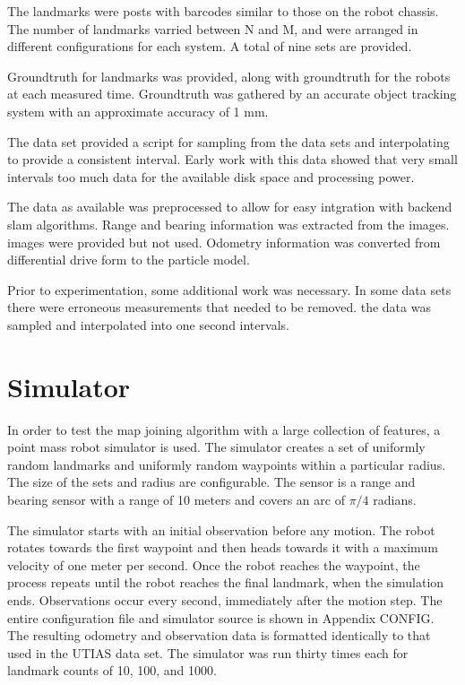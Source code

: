 \documentclass[12pt]{report}
\begin{document}
The landmarks were posts with barcodes similar to those on the robot chassis.  The number of landmarks varried between N and M, and were arranged in different configurations for each system.  A total of nine sets are provided.

Groundtruth for landmarks was provided, along with groundtruth for the robots at each measured time.  Groundtruth was gathered by an accurate object tracking system with an approximate accuracy of 1 mm.

The data set provided a script for sampling from the data sets and interpolating to provide a consistent interval.  Early work with this data showed that very small intervals too much data for the available disk space and processing power.  

The data as available was preprocessed to allow for easy intgration with backend slam algorithms.  Range and bearing information was extracted from the images.   images were provided but not used.  Odometry information was converted from differential drive form to the particle model.

Prior to experimentation, some additional work was necessary.  In some data sets there were erroneous measurements that needed to be removed.  the data was sampled and interpolated into one second intervals.    


\section{Simulator}
In order to test the map joining algorithm with a large collection of features, a point mass robot simulator is used.  The simulator creates a set of uniformly random landmarks and uniformly random waypoints within a particular radius.  The size of the sets and radius are configurable.  The sensor is a range and bearing sensor with a range of 10 meters and covers an arc of $\pi/4$ radians.  

The simulator starts with an initial observation before any motion.  The robot rotates towards the first waypoint and then heads towards it with a maximum velocity of one meter per second.  Once the robot reaches the waypoint, the process repeats until the robot reaches the final landmark, when the simulation ends.  Observations occur every second, immediately after the motion step.  The entire configuration file and simulator source is shown in Appendix {CONFIG}.  The resulting odometry and observation data is formatted identically to that used in the UTIAS data set.  The simulator was run thirty times each for landmark counts of 10, 100, and 1000.
\end{document}
